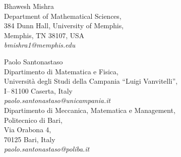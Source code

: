 \documentclass[12pt]{amsart}
\begin{document}

%


\medskip

Bhawesh Mishra \\
Department of Mathematical Sciences, \\
384 Dunn Hall, University of Memphis,\\
Memphis, TN 38107, USA \\
{{\em bmishra1@memphis.edu}}


\medskip

Paolo Santonastaso\\
Dipartimento di Matematica e Fisica,\\
Universit\`a degli Studi della Campania ``Luigi Vanvitelli'',\\
I--\,81100 Caserta, Italy\\
{{\em paolo.santonastaso@unicampania.it}}\\
Dipartimento di Meccanica, Matematica e Management, \\
Politecnico di Bari, \\
Via Orabona 4, \\
70125 Bari, Italy \\
{{\em paolo.santonastaso@poliba.it}}
\end{document}
